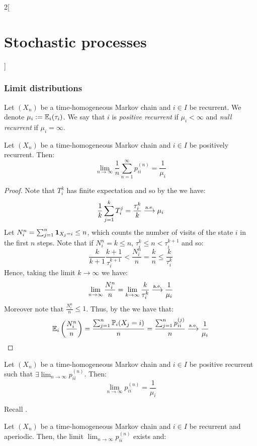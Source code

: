 \documentclass[../../../main_math.tex]{subfiles}
\begin{document}
\begin{multicols}{2}[\section{Stochastic processes}]
  \subsubsection{Limit distributions}
  \begin{definition}
    Let $(X_n)$ be a time-homogeneous Markov chain and $i\in I$ be recurrent. We denote $\mu_i:=\mathbb{E}_i(\tau_i)$. We say that $i$ is \emph{positive recurrent} if $\mu_i<\infty$ and \emph{null recurrent} if $\mu_i=\infty$.
  \end{definition}
  \begin{theorem}
    Let $(X_n)$ be a time-homogeneous Markov chain and $i\in I$ be positively recurrent. Then:
    $$
      \lim_{n\to\infty}\frac{1}{n}\sum_{n=1}^\infty p_{ii}^{(n)}=\frac{1}{\mu_i}
    $$
  \end{theorem}
  \begin{proof}
    Note that $T_i^k$ has finite expectation and so by the  we have:
    $$\frac{1}{k}\sum_{j=1}^{k}T_i^j=\frac{\tau_i^k}{k}\overset{\text{a.e.}}{\longrightarrow}\mu_i$$
    Let $N_i^n=\sum_{j=1}^n\boldsymbol{\mathrm{1}}_{X_j=i}\leq n$, which counts the number of visits of the state $i$ in the first $n$ steps. Note that if $N_i^n=k\leq n$, $\tau_i^k\leq n<\tau_i^{k+1}$ and so:
    $$
      \frac{k}{k+1}\frac{k+1}{\tau_i^{k+1}}<\frac{N_i^n}{n}=\frac{k}{n}\leq \frac{k}{\tau_i^k}
    $$
    Hence, taking the limit $k\to\infty$ we have: $$\displaystyle\lim_{n\to\infty}\frac{N_i^n}{n}=\lim_{k\to\infty}\frac{k}{\tau_i^k}\overset{\text{a.e.}}{\longrightarrow}\frac{1}{\mu_i}$$ Moreover note that $\frac{N_i^n}{n}\leq 1$. Thus, by the  we have that:
    $$
      \mathbb{E}_i\left(\frac{N_i^n}{n}\right)=\frac{\sum_{j=1}^n \mathbb{P}_i(X_j=i)}{n}=\frac{\sum_{j=1}^n p_{ii}^{(j)}}{n}\overset{\text{a.e.}}{\longrightarrow}\frac{1}{\mu_i}
    $$
  \end{proof}
  \begin{corollary}
    Let $(X_n)$ be a time-homogeneous Markov chain and $i\in I$ be positive recurrent such that $\displaystyle\exists\lim_{n\to\infty}p_{ii}^{(n)}$. Then:
    $$
      \lim_{n\to\infty} p_{ii}^{(n)}=\frac{1}{\mu_i}
    $$
  \end{corollary}
  \begin{sproof}
    Recall .
  \end{sproof}
  \begin{theorem}\label{SP:ergotic2}
    Let $(X_n)$ be a time-homogeneous Markov chain and $i\in I$ be recurrent and aperiodic. Then, the limit $\displaystyle\lim_{n\to\infty}p_{ii}^{(n)}$ exists and:

\end{theorem}
\end{multicols}
\end{document}
